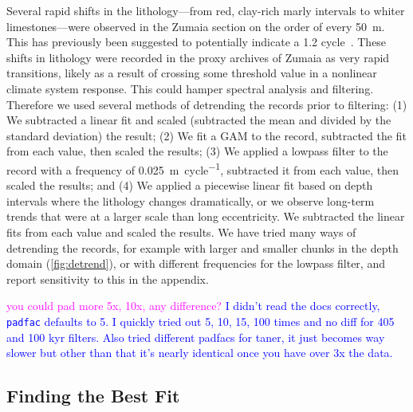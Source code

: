 \documentclass[draft]{agujournal2019}
\newcommand{\rez}{\textcolor{magenta}}
\newcommand{\ijk}{\textcolor{blue}}
\begin{document}
Several rapid shifts in the lithology---from red, clay-rich marly intervals to whiter limestones---were observed in the Zumaia section on the order of every \qty{50}{\metre}.
This has previously been suggested to potentially indicate a \qty{1.2}{\millionyear} cycle~.
These shifts in lithology were recorded in the proxy archives of Zumaia as very rapid transitions, likely as a result of crossing some threshold value in a nonlinear climate system response.
This could hamper spectral analysis and filtering.
Therefore we used several methods of detrending the records prior to filtering:
(1) We subtracted a linear fit and scaled (subtracted the mean and divided by the standard deviation) the result;
(2) We fit a \gls{GAM} to the record, subtracted the fit from each value, then scaled the results;
(3) We applied a lowpass filter to the record with a frequency of \qty{0.025}{\metre\per cycle}, subtracted it from each value, then scaled the results;
and (4) We applied a piecewise linear fit based on depth intervals where the lithology changes dramatically, or we observe long-term trends that were at a larger scale than long eccentricity.
We subtracted the linear fits from each value and scaled the results.
We have tried many ways of detrending the records, for example with larger and smaller chunks in the depth domain (\cref{fig:detrend}), or with different frequencies for the lowpass filter, and report sensitivity to this in the appendix.

\rez{you could pad more 5x, 10x, any difference?}
\ijk{I didn't read the docs correctly, \texttt{padfac} defaults to 5.
    I quickly tried out 5, 10, 15, 100 times and no diff for 405 and 100 kyr filters.
    Also tried different padfacs for taner, it just becomes way slower but other than that it's nearly identical once you have over 3x the data.}

\subsection{Finding the Best Fit}\label{sec:algorithm}
\end{document}
